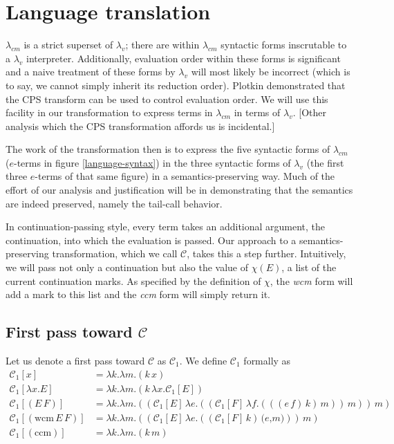 \documentclass[ms,electronic,twosidetoc,letterpaper,chaptercenter,parttop]{byumsphd}
\begin{document}
\section{Language translation}

$\lambda_{cm}$ is a strict superset of $\lambda_{v}$; there are within $\lambda_{cm}$
syntactic forms inscrutable to a $\lambda_{v}$ interpreter. Additionally, evaluation order
within these forms is significant and a naive treatment of these forms by $\lambda_{v}$
will most likely be incorrect (which is to say, we cannot simply inherit its reduction
order). Plotkin \cite{plotkin1975call} demonstrated that the CPS transform can be used to
control evaluation order. We will use this facility in our transformation to express terms
in $\lambda_{cm}$ in terms of $\lambda_{v}$. [Other analysis which the CPS transformation
affords us \cite{appel2007compiling} is incidental.]

The work of the transformation then is to express the five syntactic forms of
$\lambda_{cm}$ ($e$-terms in figure \ref{language-syntax}) in the three syntactic forms of
$\lambda_{v}$ (the first three $e$-terms of that same figure) in a semantics-preserving
way. Much of the effort of our analysis and justification will be in demonstrating that
the semantics are indeed preserved, namely the tail-call behavior.

In continuation-passing style, every term takes an additional argument, the continuation,
into which the evaluation is passed. Our approach to a semantics-preserving
transformation, which we call $\mathcal{C}$, takes this a step further. Intuitively, we
will pass not only a continuation but also the value of $\chi(E)$, a list of the current 
continuation marks. As specified by the definition of $\chi$, the \emph{wcm} form will 
add a mark to this list and the \emph{ccm} form will simply return it.

\subsection{First pass toward $\mathcal{C}$}

Let us denote a first pass toward $\mathcal{C}$ as $\mathcal{C}_{1}$. We define 
$\mathcal{C}_{1}$ formally as 
\begin{align*}
\mathcal{C}_{1}[x]                      &= \lambda k.\lambda m.(k\,x)\\
\mathcal{C}_{1}[\lambda x.E]            &= \lambda k.\lambda m.(k\,\lambda x.\mathcal{C}_{1}[E])\\
\mathcal{C}_{1}[(E\,F)]                 &= \lambda k.\lambda m.((\mathcal{C}_{1}[E]\,\lambda e.((\mathcal{C}_{1}[F]\,\lambda f.(((e\,f)\,k)\,m))\,m))\,m)\\
\mathcal{C}_{1}[(\mathrm{wcm}\,E\,F)]   &= \lambda k.\lambda m.((\mathcal{C}_{1}[E]\,\lambda e.((\mathcal{C}_{1}[F]\,k)\,\textbf{(}e\textbf{,}m\textbf{)}))\,m)\\
\mathcal{C}_{1}[(\mathrm{ccm})]         &= \lambda k.\lambda m.(k\,m)
\end{align*}
\end{document}
